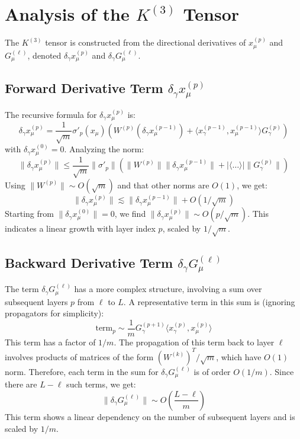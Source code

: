 \documentclass[11pt,a4paper]{article}
\begin{document}
\section{Analysis of the $K^{(3)}$ Tensor}

The $K^{(3)}$ tensor is constructed from the directional derivatives of $x^{(p)}_\mu$ and $G^{(\ell)}_\mu$, denoted $\delta_\gamma x^{(p)}_\mu$ and $\delta_\gamma G^{(\ell)}_\mu$.

\subsection{Forward Derivative Term $\delta_\gamma x^{(p)}_\mu$}

The recursive formula for $\delta_\gamma x^{(p)}_\mu$ is:
\begin{equation}
    \delta_\gamma x^{(p)}_\mu = \frac{1}{\sqrt{m}} \sigma'_{p}(x_\mu) \left( W^{(p)} (\delta_\gamma x^{(p-1)}_\mu) + \langle x^{(p-1)}_\gamma, x^{(p-1)}_\mu \rangle G^{(p)}_\gamma \right)
\end{equation}
with $\delta_\gamma x^{(0)}_\mu = 0$. Analyzing the norm:
\begin{equation}
    \|\delta_\gamma x^{(p)}_\mu\| \le \frac{1}{\sqrt{m}} \|\sigma'_{p}\| \left( \|W^{(p)}\| \|\delta_\gamma x^{(p-1)}_\mu\| + |\langle \dots \rangle| \|G^{(p)}_\gamma\| \right)
\end{equation}
Using $\|W^{(p)}\| \sim O(\sqrt{m})$ and that other norms are $O(1)$, we get:
\begin{equation}
    \|\delta_\gamma x^{(p)}_\mu\| \lesssim \|\delta_\gamma x^{(p-1)}_\mu\| + O(1/\sqrt{m})
\end{equation}
Starting from $\|\delta_\gamma x^{(0)}_\mu\| = 0$, we find $\|\delta_\gamma x^{(p)}_\mu\| \sim O(p/\sqrt{m})$. This indicates a linear growth with layer index $p$, scaled by $1/\sqrt{m}$.

\subsection{Backward Derivative Term $\delta_\gamma G^{(\ell)}_\mu$}

The term $\delta_\gamma G^{(\ell)}_\mu$ has a more complex structure, involving a sum over subsequent layers $p$ from $\ell$ to $L$. A representative term in this sum is (ignoring propagators for simplicity):
\begin{equation}
    \text{term}_p \sim \frac{1}{m} G^{(p+1)}_\gamma \langle x^{(p)}_\gamma, x^{(p)}_\mu \rangle
\end{equation}
This term has a factor of $1/m$. The propagation of this term back to layer $\ell$ involves products of matrices of the form $(W^{(k)})^T/\sqrt{m}$, which have $O(1)$ norm. Therefore, each term in the sum for $\delta_\gamma G^{(\ell)}_\mu$ is of order $O(1/m)$. Since there are $L-\ell$ such terms, we get:
\begin{equation}
    \|\delta_\gamma G^{(\ell)}_\mu\| \sim O\left(\frac{L-\ell}{m}\right)
\end{equation}
This term shows a linear dependency on the number of subsequent layers and is scaled by $1/m$.
\end{document}
